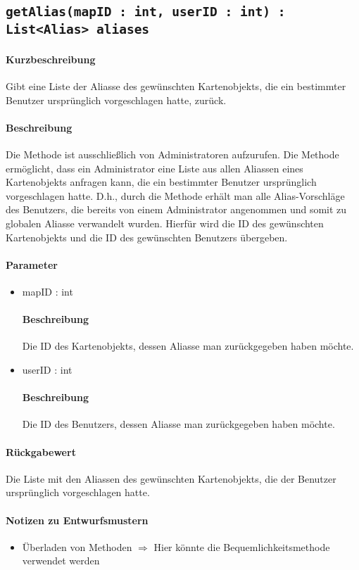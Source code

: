 \subsection{\texttt{getAlias(mapID : int, userID : int) : List<Alias> aliases}}%
\paragraph*{Kurzbeschreibung}
Gibt eine Liste der Aliasse des gewünschten Kartenobjekts, die ein bestimmter Benutzer ursprünglich vorgeschlagen hatte, zurück.
\paragraph*{Beschreibung}
Die Methode ist ausschließlich von Administratoren aufzurufen.
Die Methode ermöglicht, dass ein Administrator eine Liste aus allen Aliassen eines Kartenobjekts anfragen kann, die ein bestimmter Benutzer ursprünglich vorgeschlagen hatte.
D.h., durch die Methode erhält man alle Alias-Vorschläge des Benutzers, die bereits von einem Administrator angenommen und somit zu globalen Aliasse verwandelt wurden.
Hierfür wird die ID des gewünschten Kartenobjekts und die ID des gewünschten Benutzers übergeben.
\paragraph*{Parameter}
\begin{itemize}
    \item mapID : int
    		\paragraph*{Beschreibung}
    		Die ID des Kartenobjekts, dessen Aliasse man zurückgegeben haben möchte.
    	\item userID : int
    		\paragraph*{Beschreibung}
    		Die ID des Benutzers, dessen Aliasse man zurückgegeben haben möchte.
\end{itemize}
\paragraph*{Rückgabewert}
Die Liste mit den Aliassen des gewünschten Kartenobjekts, die der Benutzer ursprünglich vorgeschlagen hatte.

\paragraph*{Notizen zu Entwurfsmustern}
\begin{itemize}
	\item Überladen von Methoden $\Rightarrow$ Hier könnte die Bequemlichkeitsmethode verwendet werden
\end{itemize}
